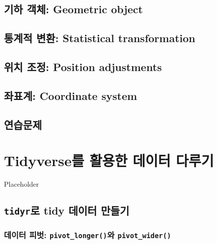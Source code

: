 \documentclass[
]{book}
\begin{document}
\hypertarget{section-geom}{%
\section{기하 객체: Geometric object}\label{section-geom}}

\hypertarget{uxd1b5uxacc4uxc801-uxbcc0uxd658-statistical-transformation}{%
\section{통계적 변환: Statistical transformation}\label{uxd1b5uxacc4uxc801-uxbcc0uxd658-statistical-transformation}}

\hypertarget{uxc704uxce58-uxc870uxc815-position-adjustments}{%
\section{위치 조정: Position adjustments}\label{uxc704uxce58-uxc870uxc815-position-adjustments}}

\hypertarget{uxc88cuxd45cuxacc4-coordinate-system}{%
\section{좌표계: Coordinate system}\label{uxc88cuxd45cuxacc4-coordinate-system}}

\hypertarget{uxc5f0uxc2b5uxbb38uxc81c-3}{%
\section{연습문제}\label{uxc5f0uxc2b5uxbb38uxc81c-3}}

\hypertarget{ch6}{%
\chapter{Tidyverse를 활용한 데이터 다루기}\label{ch6}}

Placeholder

\hypertarget{tidyruxb85c-tidy-uxb370uxc774uxd130-uxb9ccuxb4e4uxae30}{%
\section{\texorpdfstring{\texttt{tidyr}로 tidy 데이터 만들기}{tidyr로 tidy 데이터 만들기}}\label{tidyruxb85c-tidy-uxb370uxc774uxd130-uxb9ccuxb4e4uxae30}}

\hypertarget{uxb370uxc774uxd130-uxd53cuxbc97-pivot_longeruxc640-pivot_wider}{%
\subsection{\texorpdfstring{데이터 피벗: \texttt{pivot\_longer()}와 \texttt{pivot\_wider()}}{데이터 피벗: pivot\_longer()와 pivot\_wider()}}\label{uxb370uxc774uxd130-uxd53cuxbc97-pivot_longeruxc640-pivot_wider}}
\end{document}
